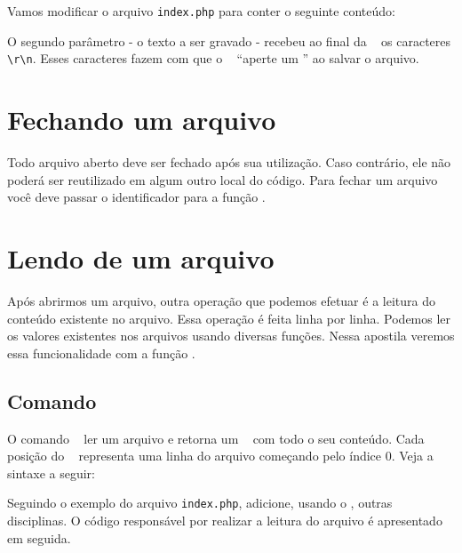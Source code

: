 Vamos modificar o arquivo \texttt{index.php} para conter o seguinte conteúdo:



O segundo parâmetro - o texto a ser gravado - recebeu ao final da \tipostring~ 
os caracteres \texttt{\textbackslash r\textbackslash n}. Esses caracteres fazem com 
que o \php~ ``aperte um \enter'' ao salvar o arquivo.

\section{Fechando um arquivo}
\label{fechando-um-arquivo}

Todo arquivo aberto deve ser fechado após sua utilização. Caso contrário, ele não 
poderá ser reutilizado em algum outro local do código. Para fechar um arquivo
você deve passar o identificador para a função \funcaofclose.




\section{Lendo de um arquivo}
\label{lendo-de-um-arquivo}

Após abrirmos um arquivo, outra operação que podemos efetuar é a leitura do conteúdo 
existente no arquivo. Essa operação é feita linha por linha. Podemos ler os 
valores existentes nos arquivos usando diversas funções. Nessa apostila 
veremos essa funcionalidade com a função \funcaofile. 

\subsection{Comando \funcaofile}
\label{comando-file}

O comando \funcaofile~ ler um arquivo e retorna um \tipoarray~ com todo o seu conteúdo.
Cada posição do \tipoarray~ representa uma linha do arquivo começando pelo índice
0. Veja a sintaxe a seguir:



Seguindo o exemplo do arquivo \texttt{index.php}, adicione, usando o \sublime,
outras disciplinas. O código responsável por realizar a leitura do arquivo é
apresentado em seguida.




